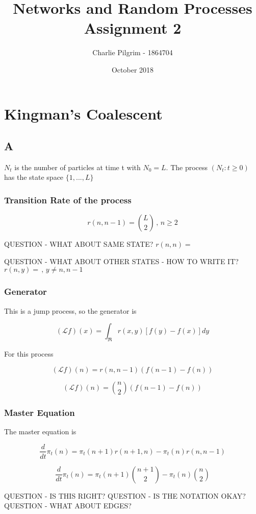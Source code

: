 \documentclass{article}
\title{Networks and Random Processes Assignment 2}
\author{Charlie Pilgrim - 1864704}
\date{October 2018}
\begin{document}
\maketitle


\section{Kingman's Coalescent}

\subsection{A}

$N_t$ is the number of particles at time t with $N_0=L$. The process $(N_t : t \geq 0)$ has the state space $\{1,...,L\}$

\subsubsection{Transition Rate of the process}

$$r(n,n-1) = {L\choose 2} \, , \, n \geq 2$$

QUESTION - WHAT ABOUT SAME STATE?
$r(n,n) = $

QUESTION - WHAT ABOUT OTHER STATES - HOW TO WRITE IT?
$r(n, y) = \, , \, y \neq n,n-1$

\subsubsection{Generator}

This is a jump process, so the generator is

$$(\mathcal{L}f)(x) = \int_{\Re} r(x,y)[f(y)-f(x)]dy$$

For this process

$$(\mathcal{L}f)(n) = r(n,n-1)(f(n-1)-f(n))$$

$$(\mathcal{L}f)(n) = {n\choose 2} (f(n-1)-f(n))$$

\subsubsection{Master Equation}

The master equation is

$$\frac{d}{dt} \pi_t(n) = \pi_t(n+1)r(n+1,n) - \pi_t(n)r(n,n-1)$$

$$\frac{d}{dt} \pi_t(n) = \pi_t(n+1){n+1\choose 2} - \pi_t(n) {n \choose 2}$$

QUESTION - IS THIS RIGHT?
QUESTION - IS THE NOTATION OKAY?
QUESTION - WHAT ABOUT EDGES? 
\end{document}
